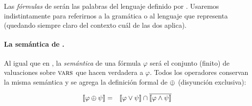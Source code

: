 Las {\em fórmulas} de \gramboolxor serán las palabras del lenguaje definido por \gramboolxor. Usaremos indistintamente \gramboolxor para referirnos a la gramática o al lenguaje que representa (quedando siempre claro del contexto cuál de las dos aplica).


\paragraph{La semántica de \gramboolxor.}

Al igual que en \grambool, la {\em semántica} de una fórmula $\varphi$ será el conjunto (finito) de valuaciones sobre $\textsc{vars}$ que hacen verdadera a $\varphi$. Todos los operadores conservan la misma semántica y se agrega la definición formal de $\oplus$ (disyunción exclusiva):

%
\begin{eqnarray*}
\llbracket \varphi\oplus\psi\rrbracket &=& \llbracket \varphi\vee\psi\rrbracket\cap \overline{\llbracket \varphi\wedge\psi\rrbracket}\\
\end{eqnarray*}








